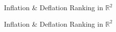 \documentclass[xcolor=dvipsnames]{beamer}
\begin{document}
\begin{frame}{Inflation \& Deflation Ranking in $\mathbb{R}^2$}
\begin{figure}
\end{figure}
\end{frame}

\begin{frame}{Inflation \& Deflation Ranking in $\mathbb{R}^2$}
\begin{figure}
\end{figure}
\end{frame}
\end{document}
